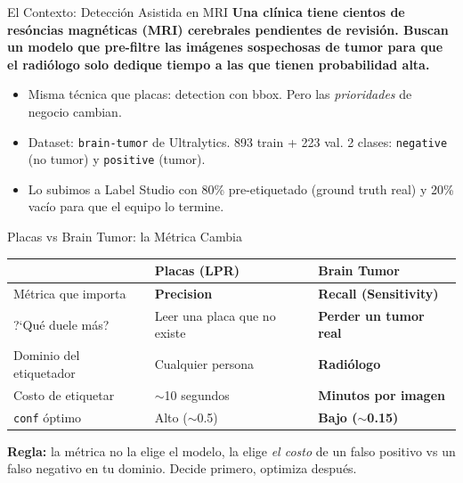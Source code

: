\documentclass[aspectratio=169, 11pt]{beamer}
\begin{document}
\begin{frame}[shrink]{El Contexto: Detecci\'on Asistida en MRI}
  \vspace{6pt}
  {\footnotesize\color{arcaDark}\bfseries
    Una cl\'inica tiene cientos de res\'oncias magn\'eticas (MRI) cerebrales
    pendientes de revisi\'on. Buscan un modelo que pre-filtre las
    im\'agenes sospechosas de tumor para que el radi\'ologo solo dedique
    tiempo a las que tienen probabilidad alta.}

  \vspace{12pt}
  {\footnotesize
  \begin{itemize}\setlength{\itemsep}{5pt}
    \item[{\color{arcaRed}\scriptsize\faArrowRight}]
      Misma t\'ecnica que placas: detection con bbox. Pero las
      \emph{prioridades} de negocio cambian.
    \item[{\color{arcaRed}\scriptsize\faArrowRight}]
      Dataset: \texttt{brain-tumor} de Ultralytics. 893 train + 223
      val. 2 clases: \texttt{negative} (no tumor) y \texttt{positive}
      (tumor).
    \item[{\color{codeGreen}\scriptsize\faArrowRight}]
      Lo subimos a Label Studio con 80\% pre-etiquetado (ground truth
      real) y 20\% vac\'io para que el equipo lo termine.
  \end{itemize}
  }
\end{frame}

\begin{frame}[shrink]{Placas vs Brain Tumor: la M\'etrica Cambia}
  \vspace{10pt}
  {\footnotesize
  \begin{tabular}{@{}p{4.0cm} p{4.0cm} p{4.0cm}@{}}
    \toprule
    & \textbf{Placas (LPR)} & \textbf{Brain Tumor} \\
    \midrule
    \rowcolor{arcaGray}
    M\'etrica que importa
    & \textbf{Precision}
    & \textbf{Recall (Sensitivity)} \\
    ?`Qu\'e duele m\'as?
    & Leer una placa que no existe
    & \textbf{Perder un tumor real} \\
    \rowcolor{arcaGray}
    Dominio del etiquetador
    & Cualquier persona
    & \textbf{Radi\'ologo} \\
    Costo de etiquetar
    & $\sim$10 segundos
    & \textbf{Minutos por imagen} \\
    \rowcolor{arcaGray}
    \texttt{conf} \'optimo
    & Alto ($\sim$0.5)
    & \textbf{Bajo ($\sim$0.15)} \\
    \bottomrule
  \end{tabular}
  }

  \vspace{14pt}
  \begin{tcolorbox}[colback=arcaRed!8, colframe=arcaRed, boxrule=0.5pt,
    arc=2pt, left=6pt, right=6pt, top=4pt, bottom=4pt]
    {\scriptsize\color{arcaDark}
    \faKey\hspace{4pt}\textbf{Regla:} la m\'etrica no la elige el modelo,
    la elige \emph{el costo} de un falso positivo vs un falso negativo
    en tu dominio. Decide primero, optimiza despu\'es.}
  \end{tcolorbox}
\end{frame}
\end{document}
